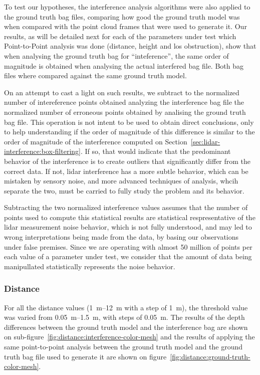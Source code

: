 To test our hypotheses, the interference analysis algorithms were also applied to the ground truth bag files, comparing how good the ground truth model was when compared with the point cloud frames that were used to generate it. Our results, as will be detailed next for each of the parameters under test which Point-to-Point analysis was done (distance, height and \ac{los} obstruction), show that when analysing the ground truth bag for ``inteference'', the same order of magnitude is obtained when analysing the actual interfered bag file. Both bag files where compared against the same ground truth model.

On an attempt to cast a light on such results, we subtract to the normalized number of intereference points obtained analyzing the interference bag file the normalized number of erroneous points obtained by analising the ground truth bag file. This operation is not intent to be used to obtain direct conclusions, only to help understanding if the order of magnitude of this difference is similar to the order of magnitude of the interference computed on Section~\ref{sec:lidar-interference:box-filtering}. If so, that would indicate that the predominant behavior of the interference is to create outliers that significantly differ from the correct data. If not, \ac{lidar} interference has a more subtle behavior, which can be mistaken by sensory noise, and more advanced techniques of analysis, whcih separate the two, must be carried to fully study the problem and its behavior.

Subtracting the two normalized interference values assumes that the number of points used to compute this statistical results are statistical respresentative of the \ac{lidar} measurement noise behavior, which is not fully understood, and may led to wrong interpretations being made from the data, by basing our observations under false premises. Since we are operating with almost 50 million of points per each value of a parameter under test, we consider that the amount of data being manipullated statistically represents the noise behavior.

\subsubsection{Distance}
For all the distance values (\SIrange{1}{12}{\meter} with a step of \SI{1}{\meter}), the threshold value was varied from \SIrange{0.05}{1.5}{\meter}, with steps of \SI{0.05}{\meter}. The results of the depth differences between the ground truth model and the interference bag are shown on sub-figure~\ref{fig:distance:interference-color-mesh} and the results of applying the same point-to-point analysis between the ground truth model and the ground truth bag file used to generate it are shown on figure~\ref{fig:distance:ground-truth-color-mesh}.

